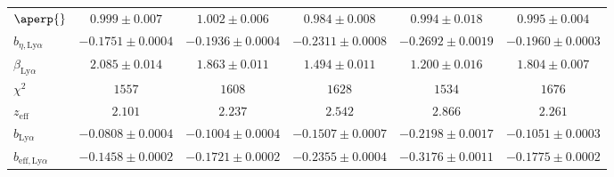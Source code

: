 \begin{table}[h]
\begin{tabular}{lccccc}
$\aperp{} $ & $ 0.999 \pm 0.007$ & $ 1.002 \pm 0.006$ & $ 0.984 \pm 0.008$ & $ 0.994 \pm 0.018$ & $ 0.995 \pm 0.004$ \\
$b_{\eta, \mathrm{Ly}\alpha} $ & $ -0.1751 \pm 0.0004$ & $ -0.1936 \pm 0.0004$ & $ -0.2311 \pm 0.0008$ & $ -0.2692 \pm 0.0019$ & $ -0.1960 \pm 0.0003$ \\
$\beta_{\mathrm{Ly}\alpha} $ & $ 2.085 \pm 0.014$ & $ 1.863 \pm 0.011$ & $ 1.494 \pm 0.011$ & $ 1.200 \pm 0.016$ & $ 1.804 \pm 0.007$ \\
\midrule
$\chi^2$ & $ 1557 $ & $ 1608 $ & $ 1628 $ & $ 1534 $ & $ 1676 $ \\
$z_{\mathrm{eff}}$ & $ 2.101 $ & $ 2.237 $ & $ 2.542 $ & $ 2.866 $ & $ 2.261 $ \\
\midrule
$b_{\mathrm{Ly}\alpha} $ & $ -0.0808 \pm 0.0004$ & $ -0.1004 \pm 0.0004$ & $ -0.1507 \pm 0.0007$ & $ -0.2198 \pm 0.0017$ & $ -0.1051 \pm 0.0003$ \\
$b_{\mathrm{eff}, \mathrm{Ly}\alpha} $ & $ -0.1458 \pm 0.0002$ & $ -0.1721 \pm 0.0002$ & $ -0.2355 \pm 0.0004$ & $ -0.3176 \pm 0.0011$ & $ -0.1775 \pm 0.0002$ \\
\bottomrule
  \end{tabular}
\end{table}

